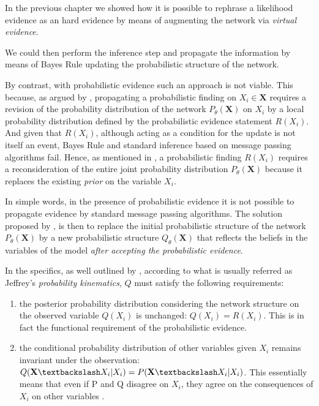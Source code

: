 \documentclass[11pt]{article}
\begin{document}
\begin{article}
In the previous chapter we showed how it is possible to rephrase a
likelihood evidence as an hard evidence by means of augmenting the
network via \emph{virtual evidence}.

We could then perform the inference step and propagate the
information by means of Bayes Rule updating the probabilistic
structure of the network.

By contrast, with probabilistic evidence such an approach is not
viable. This because, as argued by \cite{PENG_2010}, propagating a
probabilistic finding on \(X_i \in \textbf{X}\) requires a revision of
the probability distribution of the network \(P_\theta(\textbf{X})\)
on \(X_i\) by a local probability distribution defined by the
probabilistic evidence statement \(R(X_i)\). And given that \(R(X_i)\),
although acting as a condition for the update is not itself an
event, Bayes Rule and standard inference based on message passing
algorithms fail. Hence, as mentioned in \cite{Mrad_2015}, a
probabilistic finding \(R(X_i)\) requires a reconsideration of the
entire joint probability distribution \(P_\theta(\textbf{X})\) because
it replaces the existing \emph{prior} on the variable \(X_i\).

In simple words, in the presence of probabilistic evidence it is not
possible to propagate evidence by standard message passing
algorithms. The solution proposed by \cite{jeffrey1990logic}, is then
to replace the initial probabilistic structure of the network
\(P_\theta(\textbf{X})\) by a new probabilistic structure
\(Q_\theta(\textbf{X})\) that reflects the beliefs in the variables of
the model \emph{after accepting the probabilistic evidence}.

In the specifics, as well outlined by \cite{Mrad_2015}, according to
what is usually referred as Jeffrey's \emph{probability kinematics}, \(Q\)
must satisfy the following requirements:

\begin{enumerate}
\item the posterior probability distribution considering the network
structure on the observed variable \(Q(X_i)\) is unchanged: \(Q(X_i)
     = R(X_i)\). This is in fact the functional requirement of the
probabilistic evidence.

\item the conditional probability distribution of other variables given
\(X_i\) remains invariant under the observation: \(Q(\textbf{X}
     \textbackslash X_i | X_i) = P (\textbf{X} \textbackslash X_i |
     X_i)\). This essentially means that even if P and Q disagree on
\(X_i\), they agree on the consequences of \(X_i\) on other variables
\cite{Mrad_2015}.
\end{enumerate}


\end{article}
\end{document}
